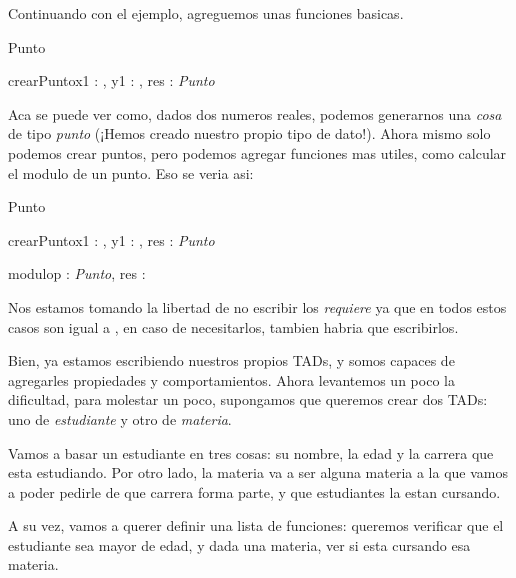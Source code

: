 \documentclass{article}
\begin{document}
Continuando con el ejemplo, agreguemos unas funciones basicas.

\begin{tad}{Punto}
	 \\
	
	\begin{proc}{crearPunto}{\In x1 : \float, \In y1 : \float, \Out res : \textit{Punto}}
	\end{proc}
\end{tad}

Aca se puede ver como, dados dos numeros reales, podemos generarnos una \textit{cosa} de tipo \textit{punto} (¡Hemos creado nuestro propio tipo de dato!). Ahora mismo solo podemos crear puntos, pero podemos agregar funciones mas utiles, como calcular el modulo de un punto. Eso se veria asi:

\begin{tad}{Punto}
	 \\
	
	\begin{proc}{crearPunto}{\In x1 : \float, \In y1 : \float, \Out res : \textit{Punto}}
	\end{proc}
	
	\begin{proc}{modulo}{\In p : \textit{Punto}, \Out res : \float}
	\end{proc}
	
\end{tad}

Nos estamos tomando la libertad de no escribir los \textit{requiere} ya que en todos estos casos son igual a \True, en caso de necesitarlos, tambien habria que escribirlos.

Bien, ya estamos escribiendo nuestros propios TADs, y somos capaces de agregarles propiedades y comportamientos. Ahora levantemos un poco la dificultad, para molestar un poco, supongamos que queremos crear dos TADs: uno de \textit{estudiante} y otro de \textit{materia}.

Vamos a basar un estudiante en tres cosas: su nombre, la edad y la carrera que esta estudiando. Por otro lado, la materia va a ser alguna materia a la que vamos a poder pedirle de que carrera forma parte, y que estudiantes la estan cursando.

A su vez, vamos a querer definir una lista de funciones: queremos verificar que el estudiante sea mayor de edad, y dada una materia, ver si esta cursando esa materia.
\end{document}

